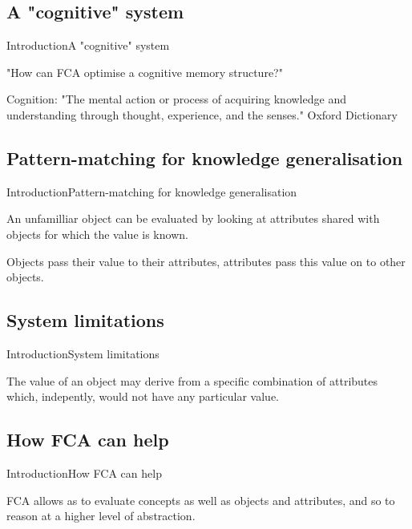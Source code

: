 \subsection{A "cognitive" system}
\begin{frame}{Introduction}{A "cognitive" system}

"How can FCA  optimise a cognitive memory  structure?"

Cognition:
"The mental action or process of acquiring knowledge and understanding through 
thought, experience, and the senses."
Oxford Dictionary

\end{frame}

\subsection{Pattern-matching for knowledge generalisation}
\begin{frame}{Introduction}{Pattern-matching for knowledge generalisation}

An unfamilliar object can be evaluated by looking at attributes shared with 
objects for which the value is known.

Objects pass their value to their attributes, attributes pass this value on to 
other objects.

\end{frame}

\subsection{System limitations}
\begin{frame}{Introduction}{System limitations}

The value of an object may derive from a specific combination of attributes 
which, indepently, would not have any particular value.

\end{frame}

\subsection{How FCA can help}
\begin{frame}{Introduction}{How FCA can help}

FCA allows as to evaluate concepts as well as objects and attributes, and so to 
reason at a higher level of abstraction.

\end{frame}